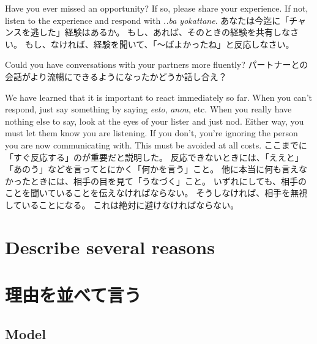 \documentclass[uplatex,dvipdfmx,b5paper,english,10pt]{jsbook}
\begin{document}
\begin{toiquestion}
\ifEnglish
Have you ever missed an opportunity?
If so, please share your experience.
If not, listen to the experience and respond with {\it ..ba yokattane\/}.
\else
あなたは今迄に「チャンスを逃した」経験はあるか。
もし、あれば、そのときの経験を共有しなさい。
もし、なければ、経験を聞いて、「～ばよかったね」と反応しなさい。
\fi
\end{toiquestion}

\begin{toiquestion}
\ifEnglish
Could you have conversations with your partners more fluently?
\else
パートナーとの会話がより流暢にできるようになったかどうか話し合え？
\fi
\end{toiquestion}
\begin{toianswer}
\ifEnglish
We have learned that it is important to react immediately so far.
When you can't respond, just say something by saying {\it eeto\/}, {\it anou\/}, etc.
When you really have nothing else to say, look at the eyes of your lister and just nod.
Either way, you must let them know you are listening.
If you don't, you're ignoring the person you are now communicating with.
This must be avoided at all costs.
\else
ここまでに「すぐ反応する」のが重要だと説明した。
反応できないときには、「ええと」「あのう」などを言ってとにかく「何かを言う」こと。
他に本当に何も言えなかったときには、相手の目を見て「うなづく」こと。
いずれにしても、相手のことを聞いていることを伝えなければならない。
そうしなければ、相手を無視していることになる。
これは絶対に避けなければならない。
\fi
\end{toianswer}

%
%

\ifEnglish
\section{Describe several reasons}
\else
\section{理由を並べて言う}
\fi


\ifEnglish
\subsection{Model}
\else
\end{document}
